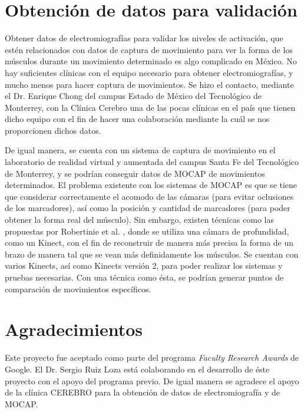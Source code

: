 \section{Obtención de datos para validación}

Obtener datos de electromiografías para validar los niveles de activación, que estén relacionados con datos de captura de movimiento para ver la forma de los músculos durante un movimiento determinado es algo complicado en México. No hay suficientes clínicas con el equipo necesario para obtener electromiografías, y mucho menos para hacer captura de movimientos. Se hizo el contacto, mediante el Dr. Enrique Chong del campus Estado de México del Tecnológico de Monterrey, con la Clínica Cerebro \citep{clinicaCerebro} una de las pocas clínicas en el país que tienen dicho equipo con el fin de hacer una colaboración mediante la cuál se nos proporcionen dichos datos.

De igual manera, se cuenta con un sistema de captura de movimiento en el laboratorio de realidad virtual y aumentada del campus Santa Fe del Tecnológico de Monterrey, y se podrían conseguir datos de MOCAP de movimientos determinados. El problema existente con los sistemas de MOCAP es que se tiene que considerar correctamente el acomodo de las cámaras (para evitar oclusiones de los marcadores), así como la posición y cantidad de marcadores (para poder obtener la forma real del músculo). Sin embargo, existen técnicas como las propuestas por Robertinie et al. \citep{robertini2013capture}, donde se utiliza una cámara de profundidad, como un Kinect, con el fin de reconstruir de manera más precisa la forma de un brazo de manera tal que se vean más definidamente los músculos. Se cuentan con varios Kinects, así como Kinects versión 2, para poder realizar los sistemas y pruebas necesarias. Con una técnica como ésta, se podrían generar puntos de comparación de movimientos específicos.

\section{Agradecimientos}

Este proyecto fue aceptado como parte del programa \textit{Faculty Research Awards} \citep{facultyResearchAward} de Google. El Dr. Sergio Ruiz Loza está colaborando en el desarrollo de éste proyecto con el apoyo del programa previo. De igual manera se agradece el apoyo de la clínica CEREBRO para la obtención de datos de electromiografía y de MOCAP.


